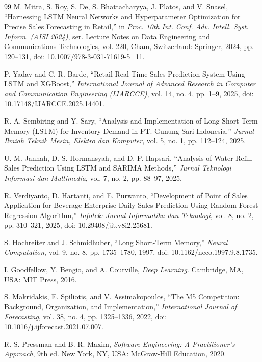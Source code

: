 \documentclass[10pt,a4paper]{article}
\begin{document}
\begin{thebibliography}{99}
M. Mitra, S. Roy, S. De, S. Bhattacharyya, J. Platos, and V. Snasel, ``Harnessing LSTM Neural Networks and Hyperparameter Optimization for Precise Sales Forecasting in Retail,'' in \textit{Proc. 10th Int. Conf. Adv. Intell. Syst. Inform. (AISI 2024)}, ser. Lecture Notes on Data Engineering and Communications Technologies, vol. 220, Cham, Switzerland: Springer, 2024, pp. 120--131, doi: 10.1007/978-3-031-71619-5\_11.

P. Yadav and C. R. Barde, ``Retail Real-Time Sales Prediction System Using LSTM and XGBoost,'' \textit{International Journal of Advanced Research in Computer and Communication Engineering (IJARCCE)}, vol. 14, no. 4, pp. 1--9, 2025, doi: 10.17148/IJARCCE.2025.14401.

R. A. Sembiring and Y. Sary, ``Analysis and Implementation of Long Short-Term Memory (LSTM) for Inventory Demand in PT. Gunung Sari Indonesia,'' \textit{Jurnal Ilmiah Teknik Mesin, Elektro dan Komputer}, vol. 5, no. 1, pp. 112--124, 2025.

U. M. Jannah, D. S. Hormansyah, and D. P. Hapsari, ``Analysis of Water Refill Sales Prediction Using LSTM and SARIMA Methods,'' \textit{Jurnal Teknologi Informasi dan Multimedia}, vol. 7, no. 2, pp. 88--97, 2025.

R. Verdiyanto, D. Hartanti, and E. Purwanto, ``Development of Point of Sales Application for Beverage Enterprise Daily Sales Prediction Using Random Forest Regression Algorithm,'' \textit{Infotek: Jurnal Informatika dan Teknologi}, vol. 8, no. 2, pp. 310--321, 2025, doi: 10.29408/jit.v8i2.25681.

S. Hochreiter and J. Schmidhuber, ``Long Short-Term Memory,'' \textit{Neural Computation}, vol. 9, no. 8, pp. 1735--1780, 1997, doi: 10.1162/neco.1997.9.8.1735.

I. Goodfellow, Y. Bengio, and A. Courville, \textit{Deep Learning}. Cambridge, MA, USA: MIT Press, 2016.

S. Makridakis, E. Spiliotis, and V. Assimakopoulos, ``The M5 Competition: Background, Organization, and Implementation,'' \textit{International Journal of Forecasting}, vol. 38, no. 4, pp. 1325--1336, 2022, doi: 10.1016/j.ijforecast.2021.07.007.

R. S. Pressman and B. R. Maxim, \textit{Software Engineering: A Practitioner's Approach}, 9th ed. New York, NY, USA: McGraw-Hill Education, 2020.


\end{thebibliography}
\end{document}
